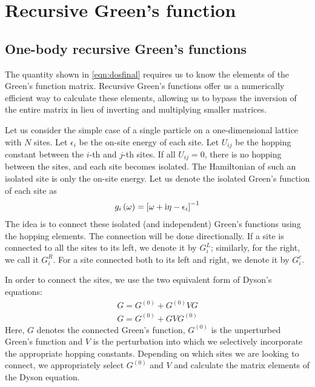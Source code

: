 \chapter{\label{rgf}Recursive Green's function}

\setcounter{equation}{0}
\setcounter{table}{0}
\setcounter{figure}{0}

\section{One-body recursive Green's functions}
	The quantity shown in \eqref{eqn:dosfinal} requires us to know the elements of the Green's function matrix. Recursive Green's functions offer us a numerically efficient way to calculate these elements, allowing us to bypass the inversion of the entire matrix in lieu of inverting and multiplying smaller matrices.
	
	Let us consider the simple case of a single particle on a one-dimensional lattice with $ N $ sites. Let $ \epsilon_i $ be the on-site energy of each site. Let $ U_{ij} $ be the hopping constant between the $ i $-th and $ j $-th sites. If all $ U_{ij} = 0 $, there is no hopping between the sites, and each site becomes isolated. The Hamiltonian of such an isolated site is only the on-site energy. Let us denote the isolated Green's function of each site as
	\begin{align}
		g_{i} \left( \omega \right) = \left[ \omega + \mathrm{i} \eta - \epsilon_i \right]^{-1}
	\end{align}
	The idea is to connect these isolated (and independent) Green's functions using the hopping elements. The connection will be done directionally. If a site is connected to all the sites to its left, we denote it by $ G^{L}_{i} $; similarly, for the right, we call it $ G^{R}_{i} $. For a site connected both to its left and right, we denote it by $ G^{c}_i $.
	
	In order to connect the sites, we use the two equivalent form of Dyson's equations:
	\begin{align}
		G = G^{(0)} + G^{(0)}VG\label{eqn:dysonleft}\\
		G = G^{(0)} + GVG^{(0)}\label{eqn:dysonright}
	\end{align}
	Here, $ G $ denotes the connected Green's function, $ G^{(0)} $ is the unperturbed Green's function and $ V $ is the perturbation into which we selectively incorporate the appropriate hopping constants. Depending on which sites we are looking to connect, we appropriately select $ G^{(0)} $ and $ V $ and calculate the matrix elements of the Dyson equation.
	
